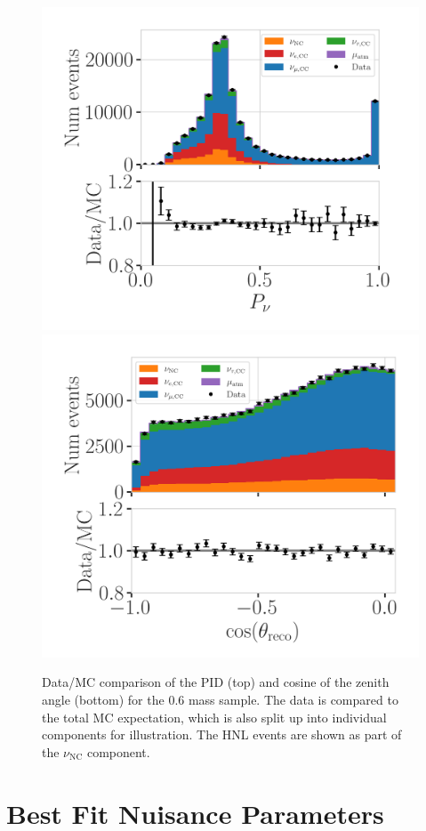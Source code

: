 \begin{figure}[h]
    \includegraphics[width=0.7\linewidth]{figures/results/best_fit/pid_data_mc_agreement.png}
    \includegraphics[width=0.7\linewidth]{figures/results/best_fit/reco_coszen_data_mc_agreement.png}
	\caption[PID and cosine of the zenith angle data/MC comparison]{Data/MC comparison of the PID (top) and cosine of the zenith angle (bottom) for the \SI{0.6}{\gev} mass sample. The data is compared to the total MC expectation, which is also split up into individual components for illustration. The HNL events are shown as part of the $\nu_\mathrm{NC}$ component.}
\end{figure}


\section{Best Fit Nuisance Parameters}

